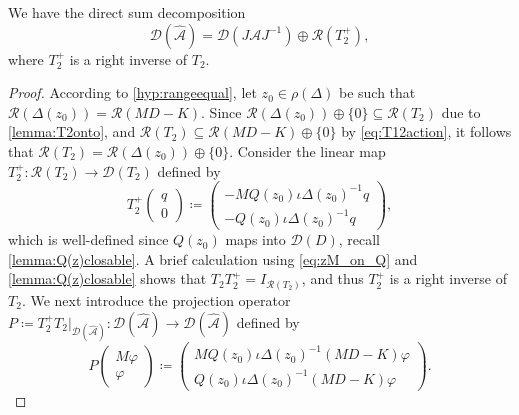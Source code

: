 \documentclass[english]{myarticle}
\begin{document}
\begin{sloppypar}
\begin{lemma} \label{lemma:DAhatcompo}
We have the direct sum decomposition
\begin{equation} \label{eq:D(Ahat)directsum}
    \mathcal{D}(\hat{\mathcal{A}}) = \mathcal{D}(J\mathcal{A}J^{-1}) \oplus \mathcal{R}(T_2^+),
\end{equation}
where $T_2^+$ is a right inverse of $T_2$.
\end{lemma}
\begin{proof}
According to \ref{hyp:rangeequal}, let $z_0\in \rho(\Delta)$ be such that $\mathcal{R}(\Delta(z_0)) = \mathcal{R}(MD - K)$. Since $\mathcal{R}(\Delta(z_0)) \oplus \{0 \} \subseteq \mathcal{R}(T_2)$ due to \cref{lemma:T2onto}, and
$\mathcal{R}(T_2) \subseteq \mathcal{R}(MD - K) \oplus \{0 \}$ by \eqref{eq:T12action}, it follows that $\mathcal{R}(T_2) = \mathcal{R}(\Delta(z_0)) \oplus \{0\}$. Consider the linear map $T_2^+ : \mathcal{R}(T_2) \to \mathcal{D}(T_2)$ defined by
\begin{equation*}
    T_2^{+}
    \begin{pmatrix}
        q \\
        0
    \end{pmatrix}
    \coloneqq
    \begin{pmatrix}
        -MQ(z_0)\iota\Delta(z_0)^{-1}q \\
        -Q(z_0)\iota\Delta(z_0)^{-1}q
    \end{pmatrix},
\end{equation*}
which is well-defined since $Q(z_0)$ maps into $\mathcal{D}(D)$, recall \cref{lemma:Q(z)closable}. 
A brief calculation using \eqref{eq:zM_on_Q} and \cref{lemma:Q(z)closable} shows that $T_2 T_2^{+} = I_{\mathcal{R}(T_2)}$, and thus $T_2^+$ is a right inverse of $T_2$. We next introduce the projection operator $P \coloneqq T_2^{+}T_2 |_{\mathcal{D}(\hat{\mathcal{A}})} : \mathcal{D}(\hat{\mathcal{A}}) \to \mathcal{D}(\hat{\mathcal{A}})$ defined by
\begin{equation} \label{eq:projectionP}
    P
    \begin{pmatrix}
        M\varphi \\
        \varphi
    \end{pmatrix}
    \coloneqq
    \begin{pmatrix}
        MQ(z_0)\iota\Delta(z_0)^{-1}(MD-K)\varphi \\
        Q(z_0)\iota\Delta(z_0)^{-1}(MD-K)\varphi
    \end{pmatrix}. 
\end{equation}

\end{proof}
\end{sloppypar}
\end{document}
